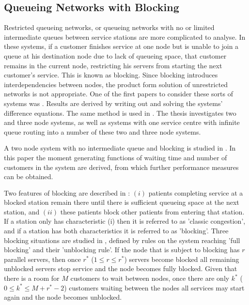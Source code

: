 \documentclass{article}
\begin{document}

\subsection{Queueing Networks with Blocking}

Restricted queueing networks, or queueing networks with no or limited intermediate queues between service stations are more complicated to analyse.
In these systems, if a customer finishes service at one node but is unable to join a queue at his destination node due to lack of queueing space, that customer remains in the current node, restricting his servers from starting the next customer's service.
This is known as blocking.
Since blocking introduces interdependencies between nodes, the product form
solution of unrestricted networks is not appropriate. %
One of the first papers to consider these sorts of systems was \cite{hunt56}.
Results are derived by writing out and solving the systems' difference equations.
The same method is used in \cite{baber08}.
The thesis investigates two and three node systems, as well as systems with one
service centre with infinite queue routing into a number of these two and three node systems.

A two node system with no intermediate queue and blocking is studied in \cite{aviitzhakyadin65}.
In this paper the moment generating functions of waiting time and number of customers in the system are derived, from which further performance measures can be obtained.

Two features of blocking are described in \cite{koizumietal05}: $(i)$ patients completing service at a blocked station remain there until there is sufficient queueing space at the next station, and $(ii)$ these patients block other patients from entering that station.
If a station only has characteristic (i) then it is referred to as 'classic congestion', and if a station has both characteristics it is referred to as 'blocking'.
Three blocking situations are studied in \cite{latoucheneuts80}, defined by rules on the system reaching 'full blocking' and their 'unblocking rule'.
If the node that is subject to blocking has $r$ parallel servers, then once $r^*$ ($1\leq r\leq r^*$) servers become blocked all remaining unblocked servers stop service and the node becomes fully blocked.
Given that there is a room for $M$ customers to wait between nodes, once there are only $k^*$ ($0\leq k^*\leq M+r^*-2$) customers waiting between the nodes all services may start again and the node becomes unblocked.
\end{document}
